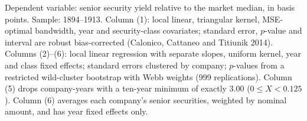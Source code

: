 Dependent variable: senior security yield relative to the market median, in basis points. Sample: 1894--1913. Column (1): local linear, triangular kernel, MSE-optimal bandwidth, year and security-class covariates; standard error, $p$-value and interval are robust bias-corrected (Calonico, Cattaneo and Titiunik 2014). Columns (2)--(6): local linear regression with separate slopes, uniform kernel, year and class fixed effects; standard errors clustered by company; $p$-values from a restricted wild-cluster bootstrap with Webb weights (999 replications). Column (5) drops company-years with a ten-year minimum of exactly 3.00 ($0 \le X < 0.125$). Column (6) averages each company's senior securities, weighted by nominal amount, and has year fixed effects only.
